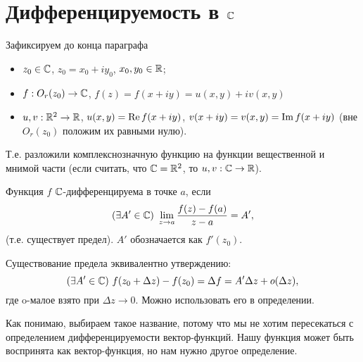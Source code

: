 \section{Дифференцируемость в $\mathbb{C}$}

Зафиксируем до конца параграфа
\begin{itemize}
	\item $z_0 \in \mathbb{C}$, $z_0 = x_0 + i y_0$, $x_0, y_0 \in \mathbb{R}$;
	\item $f: O_r(z_0) \to \mathbb{C}$, $f(z) = f(x + iy) = u(x, y) + i v(x, y)$
	\item $u, v: \mathbb{R}^2 \to \mathbb{R}$, $u(x, y) = \operatorname{Re} f(x + i y)$, $v(x + iy) = v(x, y) = \operatorname{Im} f(x + i y)$ (вне $O_r(z_0)$ положим их равными нулю).
\end{itemize}
Т.е. разложили комплекснозначную функцию на функции вещественной и мнимой части (если считать, что $\mathbb{C} = \mathbb{R}^2$, то $u, v: \mathbb{C} \to \mathbb{R}$).

\begin{definition}
	Функция $f$ $\mathbb{C}$-дифференцируема в точке $a$, если
	\[
	(\exists A' \in \mathbb{C}) \,\, \lim\limits_{z \to a} \frac{f(z) - f(a)}{z - a} = A',
	\]
	(т.е. существует предел). $A'$ обозначается как $f'(z_0)$.
\end{definition}
\begin{note}
	Существование предела эквивалентно утверждению:
	\[
		(\exists A' \in \mathbb{C}) \,\, f(z_0 + \Delta z) - f(z_0) = \Delta f = A' \Delta z + o(\Delta z),
	\]
	где o-малое взято при $\Delta z \to 0$. Можно использовать его в определении.	
\end{note}
\begin{anote}
	Как понимаю, выбираем такое название, потому что мы не хотим пересекаться с определением дифференцируемости вектор-функций. Нашу функция может быть воспринята как вектор-функция, но нам нужно другое определение.
\end{anote}


